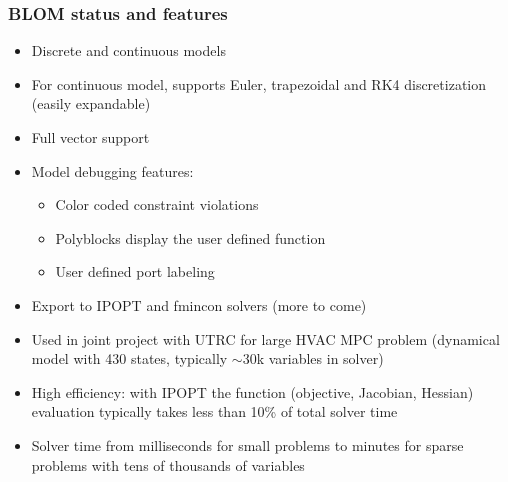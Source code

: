 \documentclass[mathserif]{beamer}
\begin{document}
\begin{frame}
\frametitle{BLOM status and features}
\begin{itemize}
\item Discrete and continuous models
\item For continuous model, supports Euler, trapezoidal and RK4 discretization
  (easily expandable)
\item Full vector support
\item Model debugging features: 
\begin{itemize}
\item Color coded constraint violations
\item Polyblocks display the user defined function
\item User defined port labeling
\end{itemize}
\item Export to IPOPT and fmincon solvers (more to come)
\item Used in joint project with UTRC for large HVAC MPC problem (dynamical
  model with 430 states, typically $\sim30$k variables in solver)
\item High efficiency: with IPOPT the function (objective, Jacobian, Hessian) evaluation typically takes less than 10\% of total solver time
\item Solver time from milliseconds for small problems to minutes for sparse problems with tens of thousands of variables
\end{itemize}



\end{frame}
\end{document}
